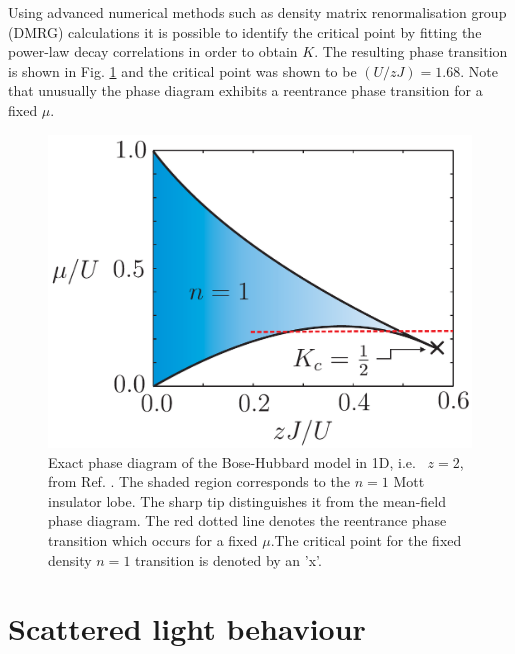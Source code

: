 Using advanced numerical methods such as density matrix
renormalisation group (DMRG) calculations it is possible to identify
the critical point by fitting the power-law decay correlations in
order to obtain $K$. The resulting phase transition is shown in
Fig. \ref{fig:1DPhase} and the critical point was shown to be
$(U/zJ) = 1.68$. Note that unusually the phase diagram exhibits a
reentrance phase transition for a fixed $\mu$.

\begin{figure}
  \centering
  \includegraphics[width=0.8\linewidth]{1DPhase}
  \caption[Exact 1D Bose-Hubbard Phase Diagram]{Exact phase diagram
    of the Bose-Hubbard model in 1D, i.e.~ $z = 2$, from
    Ref. \cite{StephenThesis}. The shaded region corresponds to the
    $n = 1$ Mott insulator lobe. The sharp tip distinguishes it from
    the mean-field phase diagram. The red dotted line denotes the
    reentrance phase transition which occurs for a fixed $\mu$.The
    critical point for the fixed density $n = 1$ transition is denoted
    by an 'x'. \label{fig:1DPhase}}
\end{figure}

\section{Scattered light behaviour}
\label{sec:a}

